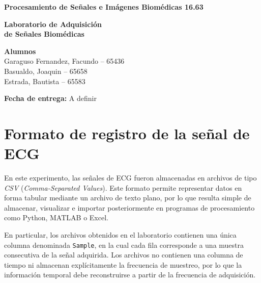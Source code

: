 \documentclass[12pt,a4paper]{article}
\begin{document}
\begin{titlepage}
    \centering

    \vspace*{2cm}

    {\Large \textbf{Procesamiento de Señales e Imágenes Biomédicas 16.63}}\\[0.4cm]

    \vspace{3cm}

    {\Huge \textbf{Laboratorio de Adquisición}}\\[0.4cm]
    {\Huge \textbf{de Señales Biomédicas}}\\

    \vspace{3cm}

    {\large
    \textbf{Alumnos}\\[0.8cm]

    Garaguso Fernandez, Facundo -- 65436\\[0.4cm]
    Basualdo, Joaquin -- 65658\\[0.4cm]
    Estrada, Bautista -- 65583
    }

    \vfill

    {\large
    \textbf{Fecha de entrega:} A definir
    }

    \vspace{1.5cm}

\end{titlepage}


\clearpage

\section{Formato de registro de la señal de ECG}

En este experimento, las señales de ECG fueron almacenadas en archivos de tipo
\textit{CSV} (\textit{Comma-Separated Values}). Este formato permite representar
datos en forma tabular mediante un archivo de texto plano, por lo que resulta
simple de almacenar, visualizar e importar posteriormente en programas de
procesamiento como Python, MATLAB o Excel.

En particular, los archivos obtenidos en el laboratorio contienen una única
columna denominada \texttt{Sample}, en la cual cada fila corresponde a una
muestra consecutiva de la señal adquirida. Los archivos no contienen una columna
de tiempo ni almacenan explícitamente la frecuencia de muestreo, por lo que la
información temporal debe reconstruirse a partir de la frecuencia de adquisición.
\end{document}
